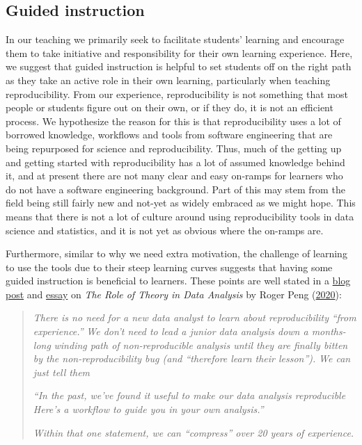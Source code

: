 \documentclass[
  12 pt,
]{paper}
\begin{document}
\hypertarget{guided-instruction}{%
\subsection{Guided instruction}\label{guided-instruction}}

In our teaching
we primarily seek to facilitate students' learning
and encourage them to take initiative and responsibility for their own learning experience.
Here, we suggest that guided instruction is helpful
to set students off on the right path as they take an active role in their own learning,
particularly when teaching reproducibility.
From our experience, reproducibility is not something that most people or
students figure out on their own,
or if they do, it is not an efficient process.
We hypothesize the reason for this is that reproducibility
uses a lot of borrowed knowledge, workflows
and tools from software engineering that are
being repurposed for science and reproducibility.
Thus, much of the getting up and getting started with reproducibility
has a lot of assumed knowledge behind it,
and at present there are not many clear and easy on-ramps for learners who
do not have a software engineering background.
Part of this may stem from the field being still fairly new
and not-yet as widely embraced as we might hope.
This means that there is not a lot of culture around using reproducibility tools in data science
and statistics, and it is not yet as obvious where the on-ramps are.

Furthermore, similar to why we need extra motivation,
the challenge of learning to use the tools due to their steep learning curves
suggests that having some guided instruction is beneficial to learners.
These points are well stated in a
\href{https://simplystatistics.org/2018/12/11/the-role-of-theory-in-data-analysis/}{blog post}
and \href{https://leanpub.com/dataanalysisessays}{essay}
on \emph{The Role of Theory in Data Analysis} by Roger Peng (\protect\hyperlink{ref-peng2020essays}{2020}):

\begin{quote}
\emph{There is no need for a new data analyst to learn about reproducibility}
\emph{``from experience.''}
\emph{We don't need to lead a junior data analysis down a months-long}
\emph{winding path of non-reproducible analysis until they are finally bitten}
\emph{by the non-reproducibility bug (and ``therefore learn their lesson'').}
\emph{We can just tell them}

\emph{``In the past, we've found it useful to make our data analysis reproducible\emph{
}Here's a workflow to guide you in your own analysis.''}

\emph{Within that one statement, we can ``compress'' over 20 years of experience.}
\end{quote}
\end{document}
